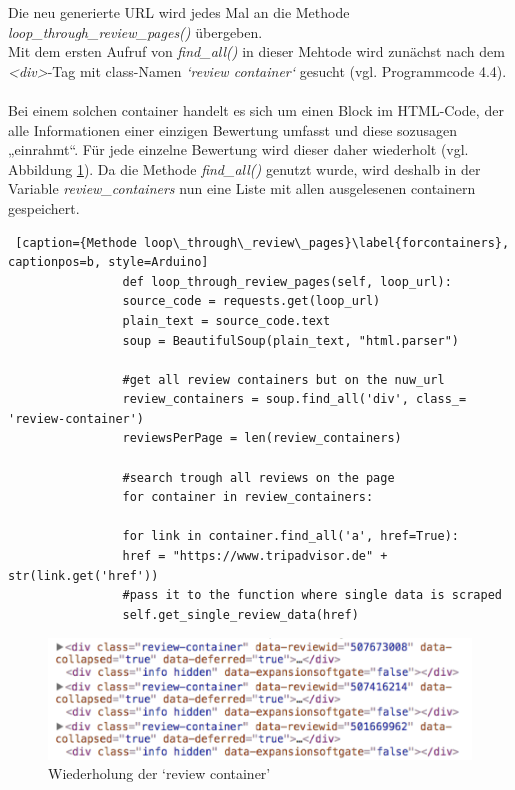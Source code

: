 \documentclass[a4paper,oneside,12pt]{report}
\begin{document}
				Die neu generierte URL wird jedes Mal an die Methode \textit{loop\_through\_review\_pages()} übergeben.
				\\
				Mit dem ersten Aufruf von \textit{find\_all()} in dieser Mehtode wird zunächst nach dem \textit{<div>}-Tag mit class-Namen \textit{‘review container‘} gesucht (vgl. Programmcode 4.4). 
				\\
				\\
				Bei einem solchen container handelt es sich um einen Block im HTML-Code, der alle Informationen einer einzigen Bewertung umfasst und diese sozusagen „einrahmt“. Für jede einzelne Bewertung wird dieser daher wiederholt (vgl. Abbildung \ref{pic-reviewcontainer}). Da die Methode \textit{find\_all()} genutzt wurde, wird deshalb in der Variable \textit{review\_containers} nun eine Liste mit allen ausgelesenen containern gespeichert.
				\\
				
				\begin{lstlisting} [caption={Methode loop\_through\_review\_pages}\label{forcontainers}, captionpos=b, style=Arduino]
				def loop_through_review_pages(self, loop_url):
				source_code = requests.get(loop_url)
				plain_text = source_code.text
				soup = BeautifulSoup(plain_text, "html.parser")
				
				#get all review containers but on the nuw_url
				review_containers = soup.find_all('div', class_= 'review-container')
				reviewsPerPage = len(review_containers)
				
				#search trough all reviews on the page
				for container in review_containers:
				
				for link in container.find_all('a', href=True):
				href = "https://www.tripadvisor.de" + str(link.get('href'))
				#pass it to the function where single data is scraped
				self.get_single_review_data(href)
				\end{lstlisting}
				
				
				
				\begin{figure}[b]
					\centering
					\begin{minipage}[b]{0.9\textwidth}
						\includegraphics[width=\textwidth]{Bilder/reviewcontainer.png}
					\end{minipage}
					\centering
					\caption[Review Container]{Wiederholung der ‘review container' \cite{bib-reviewcontainer}}
					\label{pic-reviewcontainer}
				\end{figure}
			
\end{document}
